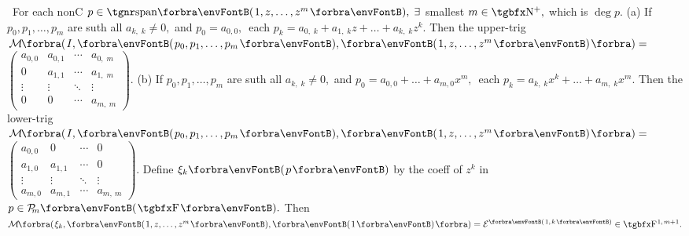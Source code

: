 \BulletPointX{} \,\,\,For each nonC $p\in\Span{1,z,\dots,z^m},\;\exists$ smallest $m\in\Nbp,$ which is $\deg p.$\TextB{}
(a) If $p_0,p_1,\dots,p_m$ are suth all $a_{k,\;\!k}\neq 0,$ and\TextB{}
\Hb $p_0=a_{0,0},\,$ each $p_k=a_{0,\;\!k}+a_{1,\;\!k}z+\dots+a_{k,\;\!k}z^k.$\TextB{\vspace{-18pt}}
\Ha Then the upper-trig $\Mt[\BigBigPar]{I,\Par{p_0,p_1,\dots,p_m},\Par{1,z,\dots,z^m}}={}${\small$\begin{pmatrix}
		a_{0,0} & a_{0,1} & \cdots & a_{0,\;\!m}\\
		0       & a_{1,1} & \cdots & a_{1,\;\!m}\\
		\vdots  & \vdots  & \ddots & \vdots\\
		0       & 0       & \cdots & a_{m,\:\!m}
	\end{pmatrix}$}.\TextB{\vspace{-8pt}}
(b) If $p_0,p_1,\dots,p_m$ are suth all $a_{k,\;\!k}\neq 0,$ and\TextB{}
\Hb $p_0=a_{0,0}+\dots+a_{m,0}x^m,\,$ each $p_k=a_{k,\;\!k}x^k+\dots+a_{m,\;\!k}x^m.$\TextB{\vspace{-18pt}}
\Hb Then the lower-trig \;$\Mt[\BigBigPar]{I,\Par{p_0,p_1,\dots,p_m},\Par{1,z,\dots,z^m}}={}${\small$\begin{pmatrix}
		a_{0,0} & 0       & \cdots & 0\\
		a_{1,0} & a_{1,1} & \cdots & 0\\
		\vdots  & \vdots  & \ddots & \vdots\\
		a_{m,0} & a_{m,1} & \cdots & a_{m,\:\!m}
	\end{pmatrix}$}.\TextB{\vspace{-12pt}}
\AComm Define $\xi_k\Par{p}$ by the coeff of $z^k$ in $p\in\PoF{m}.$\parCom\IndentB{}
Then $\Mt[\BigBigPar]{\xi_k,\Par{1,z,\dots,z^m},\Par{1}}=\mEnt{1,\;\!k}\in\FbbP{1,\;\!m+1}.$\vspace{-2pt}
\SepLine\pagebreak

